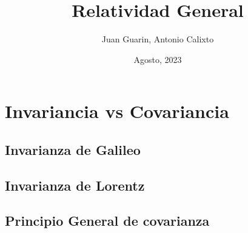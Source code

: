 \documentclass[11pt, letterpaper]{article}
\title{Relatividad General}
\author{Juan Guarin, Antonio Calixto}
\date{Agosto, 2023}
\begin{document}
\maketitle
\section{Invariancia vs Covariancia}
\subsection*{Invarianza de Galileo}
\subsection*{Invarianza de Lorentz}
\subsection*{Principio General de covarianza}
\end{document}
